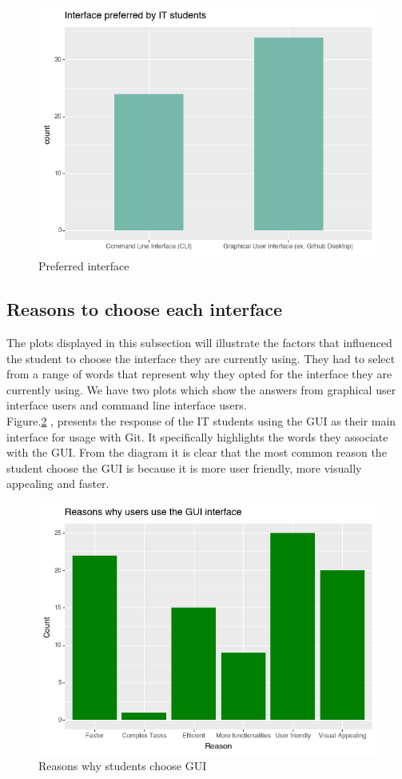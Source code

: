 \documentclass[]{report}
\begin{document}
	
	\begin{figure}[H]
		\centering
		\includegraphics[width=0.75\linewidth]{preferredInterface}
		\caption{Preferred interface}
		\label{fig: 3}
	\end{figure}
	
	\subsection{Reasons to choose each interface}
	The plots displayed in this subsection will illustrate the factors that influenced the student to choose the interface they are currently using. They had to select from a range of words that represent why they opted for the interface they are currently using. We have two plots which show the answers from graphical user interface users and command line interface users. \\
	
	Figure.\ref{fig: 4} , presents the response of the IT students using the GUI as their main interface for usage with Git. It specifically highlights the words they associate with the GUI. From the diagram it is clear that the most common reason the student choose the GUI is because it is more user friendly, more visually appealing and faster.
	
		\begin{figure}[H]
		\centering
		\includegraphics[width=0.75\linewidth]{ReasonsGUI}
		\caption{Reasons why students choose GUI}
		\label{fig: 4}
	\end{figure}
	
\end{document}
